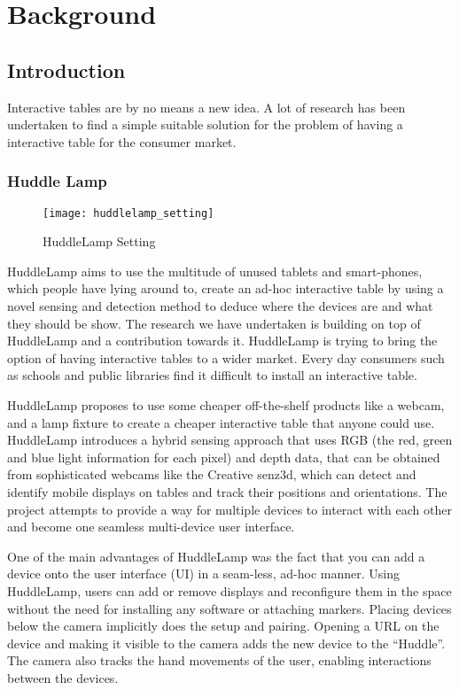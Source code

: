 
\chapter{Background}

\label{ch:background}

\section{Introduction} 

Interactive tables are by no means a new idea. A lot of research has
been undertaken to find a simple suitable solution for the problem of having a interactive table for the consumer market.

\subsection{Huddle Lamp} \label{Sec:huddlelamp}
\begin{figure}[H]
\centering
\texttt{[image: huddlelamp\_setting]}
\protect\caption{HuddleLamp Setting}
\end{figure}
HuddleLamp aims to use the multitude of unused tablets and smart-phones,
which people have lying around to, create an ad-hoc interactive table
by using a novel sensing and detection method to deduce where the
devices are and what they should be show. The research we have undertaken is building on top of HuddleLamp and a contribution towards it\cite{huddle-link}. HuddleLamp is trying to bring the option of having interactive tables to a wider market. Every day consumers such as schools and public libraries find it difficult to install an interactive table.


HuddleLamp\cite{huddlelamp-paper} proposes to use some cheaper
off-the-shelf products like a webcam, and a lamp fixture to create a cheaper
interactive table that anyone could use. HuddleLamp\cite{huddlelamp-paper} introduces a hybrid sensing approach that uses RGB (the red, green and blue light information for each pixel) and depth data, that can be obtained from sophisticated webcams like the Creative senz3d\cite{creative-senz3d}, which can detect and identify mobile displays on tables and track their positions and orientations. The project attempts to provide a way for multiple devices to interact with each other and become one seamless multi-device user interface.

One of the main advantages of HuddleLamp was the fact that you can add a device onto the user interface (UI) in a seam-less, ad-hoc manner. Using HuddleLamp,
users can add or remove displays and reconfigure them in the space without
the need for installing any software or attaching markers. Placing
devices below the camera implicitly does the setup and pairing.
Opening a URL on the device and making it visible to the camera adds
the new device to the \textquotedblleft Huddle\textquotedblright .
The camera also tracks the hand movements of the user, enabling interactions
between the devices.

